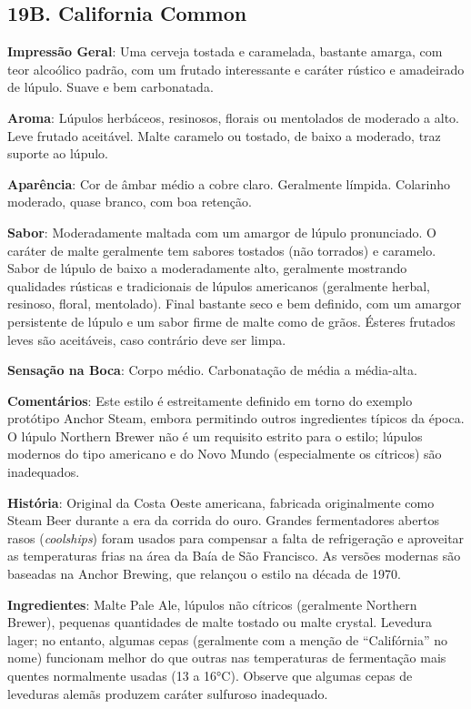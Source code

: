\subsection*{19B. California Common}
\textbf{Impressão Geral}: Uma cerveja tostada e caramelada, bastante amarga, com teor alcoólico padrão, com um frutado interessante e caráter rústico e amadeirado de lúpulo. Suave e bem carbonatada.

\textbf{Aroma}: Lúpulos herbáceos, resinosos, florais ou mentolados de moderado a alto. Leve frutado aceitável. Malte caramelo ou tostado, de baixo a moderado, traz suporte ao lúpulo.

\textbf{Aparência}: Cor de âmbar médio a cobre claro. Geralmente límpida. Colarinho moderado, quase branco, com boa retenção.

\textbf{Sabor}: Moderadamente maltada com um amargor de lúpulo pronunciado. O caráter de malte geralmente tem sabores tostados (não torrados) e caramelo. Sabor de lúpulo de baixo a moderadamente alto, geralmente mostrando qualidades rústicas e tradicionais de lúpulos americanos (geralmente herbal, resinoso, floral, mentolado). Final bastante seco e bem definido, com um amargor persistente de lúpulo e um sabor firme de malte como de grãos. Ésteres frutados leves são aceitáveis, caso contrário deve ser limpa.

\textbf{Sensação na Boca}: Corpo médio. Carbonatação de média a média-alta.

\textbf{Comentários}: Este estilo é estreitamente definido em torno do exemplo protótipo Anchor Steam, embora permitindo outros ingredientes típicos da época. O lúpulo Northern Brewer não é um requisito estrito para o estilo; lúpulos modernos do tipo americano e do Novo Mundo (especialmente os cítricos) são inadequados.

\textbf{História}: Original da Costa Oeste americana, fabricada originalmente como Steam Beer durante a era da corrida do ouro. Grandes fermentadores abertos rasos (\textit{coolships}) foram usados para compensar a falta de refrigeração e aproveitar as temperaturas frias na área da Baía de São Francisco. As versões modernas são baseadas na Anchor Brewing, que relançou o estilo na década de 1970.

\textbf{Ingredientes}: Malte Pale Ale, lúpulos não cítricos (geralmente Northern Brewer), pequenas quantidades de malte tostado ou malte crystal. Levedura lager; no entanto, algumas cepas (geralmente com a menção de “Califórnia” no nome) funcionam melhor do que outras nas temperaturas de fermentação mais quentes normalmente usadas (13 a 16°C). Observe que algumas cepas de leveduras alemãs produzem caráter sulfuroso inadequado.

